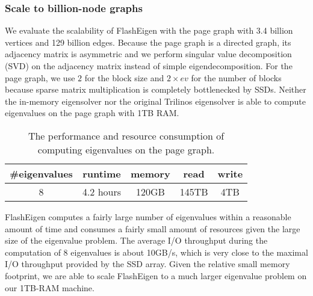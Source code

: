 %		

\subsubsection{Scale to billion-node graphs}

We evaluate the scalability of FlashEigen with the page graph with 3.4 billion
vertices and 129 billion edges. Because the page graph is a directed graph,
its adjacency matrix is asymmetric and we perform singular value decomposition
(SVD) on the adjacency matrix instead of simple eigendecomposition. For the page
graph, we use $2$ for the block size and $2 \times ev$ for the number of blocks
because sparse matrix multiplication is completely bottlenecked by SSDs.
Neither the in-memory eigensolver nor the original Trilinos eigensolver is able
to compute eigenvalues on the page graph with 1TB RAM.

\begin{table}
	\begin{center}
		\small
		\begin{tabular}{|c|c|c|c|c|}
			\hline
			\#eigenvalues & runtime & memory & read & write \\
			\hline
			8 & 4.2 hours & 120GB & 145TB & 4TB \\
			\hline
		\end{tabular}
		\normalsize
	\end{center}
	\caption{The performance and resource consumption of computing eigenvalues
	on the page graph.}
	\label{pg_ev}
\end{table}

FlashEigen computes a fairly large number of eigenvalues within a reasonable
amount of time and consumes a fairly small amount of resources given the large
size of the eigenvalue problem.
The average I/O throughput during the computation of 8 eigenvalues is about
10GB/s, which is very close to the maximal I/O throughput provided by
the SSD array.
Given the relative small memory footprint, we are able to scale FlashEigen
to a much larger eigenvalue problem on our 1TB-RAM machine.
